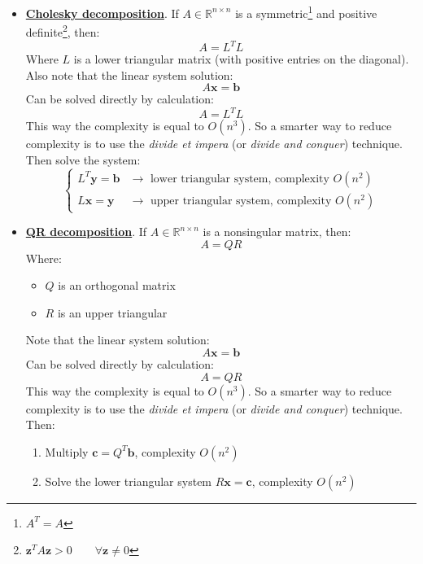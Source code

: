 \begin{itemize}
	\item \underline{\textbf{Cholesky decomposition}}. If $A \in \mathbb{R}^{n \times n}$ is a symmetric\footnote{$A^{T} = A$} and positive definite\footnote{$\mathbf{z}^{T} A \mathbf{z} > 0 \hspace{2em} \forall \mathbf{z} \ne 0$}, then:
	\begin{equation*}
		A = L^{T}L
	\end{equation*}
	Where $L$ is a lower triangular matrix (with positive entries on the diagonal). Also note that the linear system solution:
	\begin{equation*}
		A\mathbf{x} = \mathbf{b}
	\end{equation*}
	Can be solved directly by calculation:
	\begin{equation*}
		A = L^{T}L
	\end{equation*}
	This way the complexity is equal to $O\left(n^{3}\right)$. So a smarter way to reduce complexity is to use the \emph{divide et impera} (or \emph{divide and conquer}) technique. Then solve the system:
	\begin{equation*}
		\begin{cases}
			L^{T}\mathbf{y} = \mathbf{b} & \rightarrow \text{ lower triangular system, complexity } O\left(n^{2}\right) \\
			L\mathbf{x} = \mathbf{y}  & \rightarrow \text{ upper triangular system, complexity } O\left(n^{2}\right)
		\end{cases}
	\end{equation*}

	\item \underline{\textbf{QR decomposition}}. If $A \in \mathbb{R}^{n \times n}$ is a nonsingular matrix, then:
	\begin{equation*}
		A = QR
	\end{equation*}
	Where:
	\begin{itemize}
		\item $Q$ is an orthogonal matrix
		\item $R$ is an upper triangular
	\end{itemize}
	Note that the linear system solution:
	\begin{equation*}
		A\mathbf{x} = \mathbf{b}
	\end{equation*}
	Can be solved directly by calculation:
	\begin{equation*}
		A = QR
	\end{equation*}
	This way the complexity is equal to $O\left(n^{3}\right)$. So a smarter way to reduce complexity is to use the \emph{divide et impera} (or \emph{divide and conquer}) technique. Then:
	\begin{enumerate}
		\item Multiply $\mathbf{c} = Q^{T}\mathbf{b}$, complexity $O\left(n^{2}\right)$
		
		\item Solve the lower triangular system $R\mathbf{x} = \mathbf{c}$, complexity $O\left(n^{2}\right)$
	\end{enumerate}
\end{itemize}
